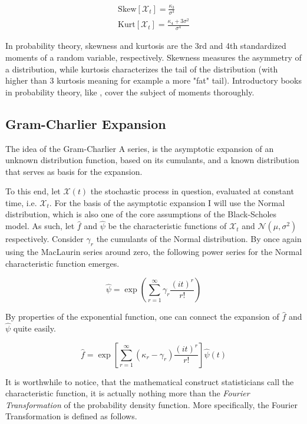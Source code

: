 \begin{gather*}
	\text{Skew}[\mathcal{X}_t] = \frac{\kappa_3}{\sigma^3} \\
	\text{Kurt}[\mathcal{X}_t] = \frac{\kappa_4 + 3 \sigma^2}{\sigma^4}
\end{gather*}


In probability theory, skewness and kurtosis are the 3rd and 4th standardized moments of a random variable, respectively. Skewness measures the asymmetry of a distribution, while kurtosis characterizes the tail of the distribution (with higher than 3 kurtosis meaning for example a more "fat" tail). Introductory books in probability theory, like \cite{blitzstein2019introduction}, cover the subject of moments thoroughly.

\subsection{Gram-Charlier Expansion}
The idea of the Gram-Charlier A series, is the asymptotic expansion of an unknown distribution function, based on its cumulants, and a known distribution that serves as basis for the expansion.

To this end, let \( \mathcal{X}(t) \) the stochastic process in question, evaluated at constant time, i.e. \( \mathcal{X}_t \). For the basis of the asymptotic expansion I will use the Normal distribution, which is also one of the core assumptions of the Black-Scholes model. As such, let $\hat{f}$ and $\hat{\psi}$ be the characteristic functions of $\mathcal{X}_t$ and $\mathcal{N}(\mu, \sigma^2)$ respectively. Consider $\gamma_r$ the cumulants of the Normal distribution. By once again using the MacLaurin series around zero, the following power series for the Normal characteristic function emerges.

\[
\hat{\psi} = \exp \left( \sum_{r=1}^{\infty} \gamma_r \frac{(it)^r}{r!} \right)
\]

By properties of the exponential function, one can connect the expansion of $\hat{f}$ and $\hat{\psi}$ quite easily.

\[
\hat{f} = \exp \left[ \sum_{r=1}^{\infty} (\kappa_{r} - \gamma_{r}) \frac{(it)^r}{r!} \right] \hat{\psi}(t) \tag{1}
\]

It is worthwhile to notice, that the mathematical construct statisticians call the characteristic function, it is actually nothing more than the \textit{Fourier Transformation} of the probability density function. More specifically, the Fourier Transformation is defined as follows.

